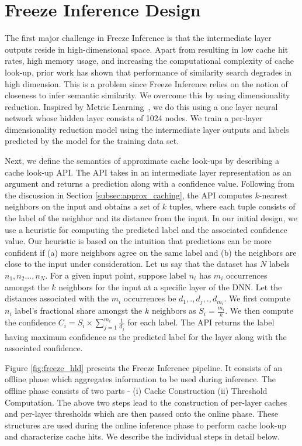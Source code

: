 \documentclass[letterpaper,twocolumn,10pt]{article}
\begin{document}
\section{Freeze Inference Design}\label{sec:design}
The first major challenge in Freeze Inference is that the intermediate layer outputs reside in high-dimensional space. Apart from resulting in low cache hit rates, high memory usage, and increasing the computational complexity of cache look-up, prior work\cite{Weber:1998:QAP:645924.671192} has shown that performance of similarity search degrades in high dimension. This is a problem since Freeze Inference relies on the notion of closeness to infer semantic similarity. We overcome this by using dimensionality reduction. Inspired by Metric Learning~\cite{xing2003distance}, we do this using a one layer neural network whose hidden layer consists of 1024 nodes. We train a per-layer dimensionality reduction model using the intermediate layer outputs and labels predicted by the model for the training data set. 

Next, we define the semantics of approximate cache look-ups by describing a cache look-up API. The API takes in an intermediate layer representation as an argument and returns a prediction along with a confidence value. Following from the discussion in Section \ref{subsec:approx_caching}, the API computes $k$-nearest neighbors on the input and obtains a set of $k$ tuples, where each tuple consists of the label of the neighbor and its distance from the input. In our initial design, we use a heuristic for computing the predicted label and the associated confidence value. Our heuristic is based on the intuition that predictions can be more confident if (a) more neighbors agree on the same label and (b) the neighbors are close to the input under consideration. Let us say that the dataset has $N$ labels $n_{1}, n_{2}...,n_{N}$. For a given input point, suppose label $n_{i}$ has $m_{i}$ occurrences amongst the $k$ neighbors for the input at a specific layer of the DNN. Let the distances associated with the $m_{i}$ occurrences be $d_{1},.,d_{j},.,d_{m_{i}}$. We first compute $n_{i}$ label's fractional share amongst the $k$ neighbors as $S_{i}=\frac{m_{i}}{k}$. We then compute the confidence $C_{i}=S_{i}\times\sum_{j=1}^{m_{i}}{\frac{1}{d_{j}}}$ for each label. The API returns the label having maximum confidence as the predicted label for the layer along with the associated confidence.

Figure \ref{fig:freeze_hld} presents the Freeze Inference pipeline. It consists of an offline phase which aggregates information to be used during inference. The offline phase consists of two parts - (i) Cache Construction  (ii) Threshold Computation. The above two steps lead to the construction of per-layer caches and per-layer thresholds which are then passed onto the online phase. These structures are used during the online inference phase to perform cache look-up and characterize cache hits. We describe the individual steps in detail below.
\end{document}
